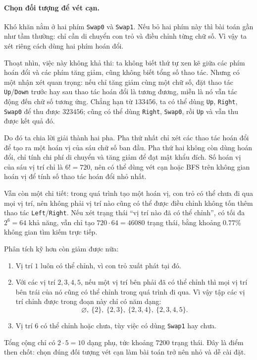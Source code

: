 \documentclass[11pt]{article}
\begin{document}
\paragraph{Chọn đối tượng để vét cạn.}
Khó khăn nằm ở hai phím \texttt{Swap0} và \texttt{Swap1}. Nếu bỏ hai phím này
thì bài toán gần như tầm thường: chỉ cần di chuyển con trỏ và điều chỉnh từng
chữ số. Vì vậy ta xét riêng cách dùng hai phím hoán đổi.

Thoạt nhìn, việc này không khả thi: ta không biết thứ tự xen kẽ giữa các phím
hoán đổi và các phím tăng giảm, cũng không biết tổng số thao tác. Nhưng có
một nhận xét quan trọng: nếu chỉ tăng giảm cùng một chữ số, đặt thao tác
\texttt{Up}/\texttt{Down} trước hay sau thao tác hoán đổi là tương đương, miễn
là nó vẫn tác động đến chữ số tương ứng. Chẳng hạn từ \(133456\), ta có thể
dùng \texttt{Up}, \texttt{Right}, \texttt{Swap0} để thu được \(323456\); cũng
có thể dùng \texttt{Right}, \texttt{Swap0}, rồi \texttt{Up} và vẫn thu được
kết quả đó.

Do đó ta chia lời giải thành hai pha. Pha thứ nhất chỉ xét các thao tác hoán
đổi để tạo ra một hoán vị của sáu chữ số ban đầu. Pha thứ hai không còn dùng
hoán đổi, chỉ tính chi phí di chuyển và tăng giảm để đạt mật khẩu đích. Số
hoán vị của sáu vị trí chỉ là \(6!=720\), nên có thể dùng vét cạn hoặc BFS
trên không gian hoán vị để tính số thao tác hoán đổi nhỏ nhất.

Vẫn còn một chi tiết: trong quá trình tạo một hoán vị, con trỏ có thể chưa
đi qua mọi vị trí, nên không phải vị trí nào cũng có thể được điều chỉnh
không tốn thêm thao tác \texttt{Left}/\texttt{Right}. Nếu xét trạng thái ``vị
trí nào đã có thể chỉnh'', có tối đa \(2^6=64\) khả năng, vẫn chỉ tạo
\(720\cdot 64=46080\) trạng thái, bằng khoảng \(0.77\%\) không gian tìm kiếm
trực tiếp.

Phân tích kỹ hơn còn giảm được nữa:
\begin{enumerate}
  \item Vị trí \(1\) luôn có thể chỉnh, vì con trỏ xuất phát tại đó.
  \item Với các vị trí \(2,3,4,5\), nếu một vị trí bên phải đã có thể chỉnh
  thì mọi vị trí bên trái của nó cũng có thể chỉnh trong quá trình đi qua.
  Vì vậy tập các vị trí chỉnh được trong đoạn này chỉ có năm dạng:
  \[
    \varnothing,\ \{2\},\ \{2,3\},\ \{2,3,4\},\ \{2,3,4,5\}.
  \]
  \item Vị trí \(6\) có thể chỉnh hoặc chưa, tùy việc có dùng \texttt{Swap1}
  hay chưa.
\end{enumerate}
Tổng cộng chỉ có \(2\cdot 5=10\) dạng phụ, tức khoảng \(7200\) trạng thái.
Đây là điểm then chốt: chọn đúng đối tượng vét cạn làm bài toán trở nên nhỏ
và dễ cài đặt.
\end{document}
